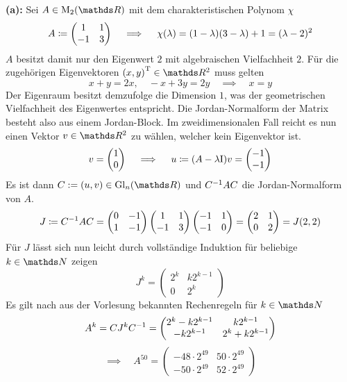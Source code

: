 		\textbf{(a):} Sei $A\in\m{M}_2(\SR)$ mit dem charakteristischen Polynom $\chi$
		\[
			A \coloneqq
			\begin{pmatrix}
				1 & 1 \\
				-1 & 3
			\end{pmatrix}
			\quad \implies \quad \chi(\lambda) = (1-\lambda)(3-\lambda) + 1 = (\lambda-2)^2
		\]
		$A$ besitzt damit nur den Eigenwert $2$ mit algebraischen Vielfachheit $2$.
		Für die zugehörigen Eigenvektoren $\transp{(x,y)}\in\SR^2$ muss gelten
		\[ x+y=2x,\quad -x+3y=2y \quad \implies \quad x=y \]
		Der Eigenraum besitzt demzufolge die Dimension $1$, was der geometrischen Vielfachheit des Eigenwertes entspricht.
		Die Jordan-Normalform der Matrix besteht also aus einem Jordan-Block.
		Im zweidimensionalen Fall reicht es nun einen Vektor $v\in\SR^2$ zu wählen, welcher kein Eigenvektor ist.
		\[
			v =
			\begin{pmatrix}
				1 \\ 0
			\end{pmatrix}
			\quad \implies \quad u\coloneqq (A-\lambda\mathrm{I})v =
			\begin{pmatrix}
				-1 \\ -1
			\end{pmatrix}
		\]
		Es ist dann $C:=(u,v)\in\m{Gl}_n(\SR)$ und ${C}^{-1}AC$ die Jordan-Normalform von $A$.
		\[
			J\coloneqq{C}^{-1}AC = 
			\begin{pmatrix}
				0 & -1 \\
				1 & -1
			\end{pmatrix}
			\begin{pmatrix}
				1 & 1 \\
				-1 & 3
			\end{pmatrix}
			\begin{pmatrix}
				-1 & 1 \\
				-1 & 0
			\end{pmatrix}
			=
			\begin{pmatrix}
				2 & 1 \\
				0 & 2
			\end{pmatrix}
			= J(2,2)
		\]
		Für $J$ lässt sich nun leicht durch vollständige Induktion für beliebige $k\in\SN$ zeigen
		\[
			J^k =
			\begin{pmatrix}
				2^k & k2^{k-1} \\
				0 & 2^k
			\end{pmatrix}
		\]
		Es gilt nach aus der Vorlesung bekannten Rechenregeln für $k\in\SN$
		\[
			A^k = CJ^k{C}^{-1} =
			\begin{pmatrix}
				2^k - k2^{k-1} & k2^{k-1} \\
				-k2^{k-1} & 2^k + k2^{k-1}
			\end{pmatrix}
		\]
		\[
			\implies \quad A^{50} =
			\begin{pmatrix}
				-48\cdot 2^{49} & 50\cdot 2^{49} \\
				-50\cdot 2^{49} & 52\cdot 2^{49}
			\end{pmatrix}
		\]

